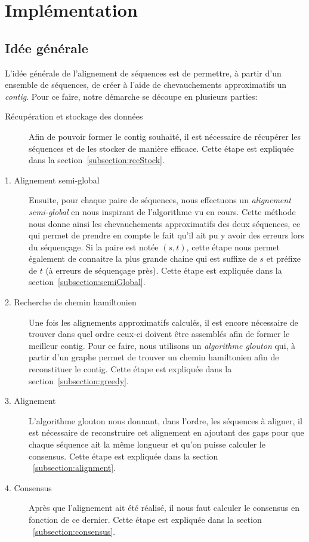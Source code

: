 \section{Implémentation}

\subsection{Idée générale}

	L'idée générale de l'alignement de séquences est de permettre, à partir d'un ensemble de séquences, de créer à l'aide de chevauchements approximatifs un \emph{contig}. Pour ce faire, notre démarche se découpe en plusieurs parties:

	\begin{description}
		\item[Récupération et stockage des données] Afin de pouvoir former le contig souhaité, il est nécessaire de récupérer les séquences et de les stocker de manière efficace. Cette étape est expliquée dans la section~\ref{subsection:recStock}.

		\item[1. Alignement semi-global] Ensuite, pour chaque paire de séquences,
			nous effectuons un \emph{alignement semi-global} en nous inspirant
			de l'algorithme vu en cours. Cette méthode nous donne ainsi
			les chevauchements approximatifs des deux séquences, ce qui permet de
			prendre en compte le fait qu'il ait pu y avoir des erreurs lors du
			séquençage. Si la paire est notée $(s, t)$, cette étape nous permet également de connaitre la plus
			grande chaine qui est suffixe de $s$ et préfixe de $t$ (à erreurs de séquençage près). Cette étape
			est expliquée dans la section~\ref{subsection:semiGlobal}.

		\item[2. Recherche de chemin hamiltonien] Une fois les alignements approximatifs
			calculés, il est encore nécessaire de trouver dans quel ordre
			ceux-ci doivent être assemblés afin de former le meilleur contig.
			Pour ce faire, nous utilisons un \emph{algorithme glouton} qui, à
			partir d'un graphe permet de trouver un chemin hamiltonien afin de
			reconstituer le contig. Cette étape est expliquée dans la
			section~\ref{subsection:greedy}.

		\item[3. Alignement]
			L'algorithme glouton nous donnant, dans l'ordre, les séquences à
			aligner, il est nécessaire de reconstruire cet alignement en
			ajoutant des gaps pour que chaque séquence ait la même longueur et
			qu'on puisse calculer le consensus. Cette étape est expliquée dans
			la section ~\ref{subsection:alignment}.

		\item[4. Consensus]
			Après que l'alignement ait été réalisé, il nous faut calculer le
			consensus en fonction de ce dernier. Cette étape est expliquée dans
			la section ~\ref{subsection:consensus}.
	\end{description}

